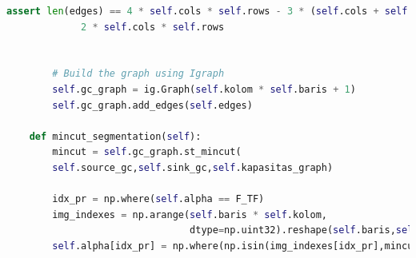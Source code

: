 \begin{lstlisting}[language=Python,basicstyle=\tiny]
		assert len(edges) == 4 * self.cols * self.rows - 3 * (self.cols + self.rows) + 2 + \
		     2 * self.cols * self.rows


		# Build the graph using Igraph
		self.gc_graph = ig.Graph(self.kolom * self.baris + 1)
		self.gc_graph.add_edges(self.edges)

	def mincut_segmentation(self):				
		mincut = self.gc_graph.st_mincut(
		self.source_gc,self.sink_gc,self.kapasitas_graph)

		idx_pr = np.where(self.alpha == F_TF)
		img_indexes = np.arange(self.baris * self.kolom,
								dtype=np.uint32).reshape(self.baris,self.kolom)
		self.alpha[idx_pr] = np.where(np.isin(img_indexes[idx_pr],mincut.partition[0]),F_TF,F_TB)
	
\end{lstlisting}


